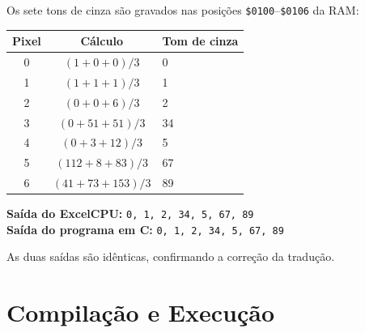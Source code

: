 \documentclass[12pt, a4paper]{article}
\begin{document}
Os sete tons de cinza são gravados nas posições \texttt{\$0100}--\texttt{\$0106} da RAM:

\begin{table}[h!]
\centering
\begin{tabular}{ccl}
  \toprule
  \textbf{Pixel} & \textbf{Cálculo} & \textbf{Tom de cinza} \\
  \midrule
  0 & $(1 + 0 + 0)/3$       & 0  \\
  1 & $(1 + 1 + 1)/3$       & 1  \\
  2 & $(0 + 0 + 6)/3$       & 2  \\
  3 & $(0 + 51 + 51)/3$     & 34 \\
  4 & $(0 + 3 + 12)/3$      & 5  \\
  5 & $(112 + 8 + 83)/3$    & 67 \\
  6 & $(41 + 73 + 153)/3$   & 89 \\
  \bottomrule
\end{tabular}
\end{table}

\begin{destaque}
  \textbf{Saída do ExcelCPU:} \quad \texttt{0, 1, 2, 34, 5, 67, 89} \\[4pt]
  \textbf{Saída do programa em C:} \quad \texttt{0, 1, 2, 34, 5, 67, 89}
\end{destaque}

As duas saídas são idênticas, confirmando a correção da tradução.

\section{Compilação e Execução}
\end{document}
